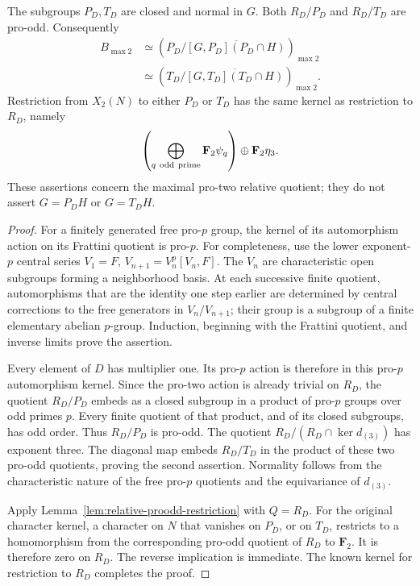 \begin{theorem}\label{thm:all-prime-residual-quadratic-domain}
The subgroups \(P_D,T_D\) are closed and normal in \(G\).
Both \(R_D/P_D\) and \(R_D/T_D\) are pro-odd. Consequently
\[
 \begin{aligned}
 B_{\max2}&\simeq
 \left(P_D/\overline{[G,P_D](P_D\cap H)}\right)_{\max2}\\
 &\simeq
 \left(T_D/\overline{[G,T_D](T_D\cap H)}\right)_{\max2}.
 \end{aligned}
\]
Restriction from \(X_2(N)\) to either \(P_D\) or \(T_D\)
has the same kernel as restriction to \(R_D\), namely
\[
 \left(\bigoplus_{q\ {\rm odd\ prime}}\mathbf F_2\psi_q\right)
                         \oplus\mathbf F_2\eta_3.
\]
These assertions concern the maximal pro-two relative quotient;
they do not assert \(G=P_DH\) or \(G=T_DH\).
\end{theorem}
\begin{proof}
For a finitely generated free pro-\(p\) group, the kernel of
its automorphism action on its Frattini quotient is pro-\(p\).
For completeness, use the lower exponent-\(p\) central series
\(V_1=F\), \(V_{n+1}=V_n^p[V_n,F]\).
The \(V_n\) are characteristic open subgroups forming a
neighborhood basis. At each successive finite quotient,
automorphisms that are the identity one step earlier are
determined by central corrections to the free generators in
\(V_n/V_{n+1}\); their group is a subgroup of a finite
elementary abelian \(p\)-group. Induction, beginning with the
Frattini quotient, and inverse limits prove the assertion.

Every element of \(D\) has multiplier one. Its pro-\(p\)
action is therefore in this pro-\(p\) automorphism kernel.
Since the pro-two action is already trivial on \(R_D\),
the quotient \(R_D/P_D\) embeds as a closed subgroup in a
product of pro-\(p\) groups over odd primes \(p\).
Every finite quotient of that product, and of its closed
subgroups, has odd order. Thus \(R_D/P_D\) is pro-odd.
The quotient \(R_D/(R_D\cap\ker d_{(3)})\) has exponent three.
The diagonal map embeds \(R_D/T_D\) in the product of these
two pro-odd quotients, proving the second assertion.
Normality follows from the characteristic nature of the
free pro-\(p\) quotients and the equivariance of \(d_{(3)}\).

Apply Lemma~\ref{lem:relative-proodd-restriction} with \(Q=R_D\).
For the original character kernel, a character on \(N\) that
vanishes on \(P_D\), or on \(T_D\), restricts to a homomorphism
from the corresponding pro-odd quotient of \(R_D\) to
\(\mathbf F_2\). It is therefore zero on \(R_D\).
The reverse implication is immediate. The known kernel for
restriction to \(R_D\) completes the proof.
\end{proof}

